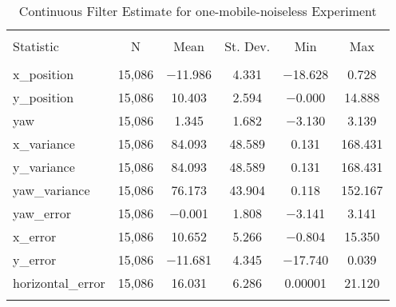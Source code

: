 
\begin{table}[h] \centering 
  \caption{Continuous Filter Estimate for one-mobile-noiseless Experiment} 
  \label{tab:one_mobile_noiseless_continuous_summary} 
\begin{tabular}{@{\extracolsep{5pt}}lccccc} 
\\[-1.8ex]\hline 
\hline \\[-1.8ex] 
Statistic & \multicolumn{1}{c}{N} & \multicolumn{1}{c}{Mean} & \multicolumn{1}{c}{St. Dev.} & \multicolumn{1}{c}{Min} & \multicolumn{1}{c}{Max} \\ 
\hline \\[-1.8ex] 
x\_position & 15,086 & $-$11.986 & 4.331 & $-$18.628 & 0.728 \\ 
y\_position & 15,086 & 10.403 & 2.594 & $-$0.000 & 14.888 \\ 
yaw & 15,086 & 1.345 & 1.682 & $-$3.130 & 3.139 \\ 
x\_variance & 15,086 & 84.093 & 48.589 & 0.131 & 168.431 \\ 
y\_variance & 15,086 & 84.093 & 48.589 & 0.131 & 168.431 \\ 
yaw\_variance & 15,086 & 76.173 & 43.904 & 0.118 & 152.167 \\ 
yaw\_error & 15,086 & $-$0.001 & 1.808 & $-$3.141 & 3.141 \\ 
x\_error & 15,086 & 10.652 & 5.266 & $-$0.804 & 15.350 \\ 
y\_error & 15,086 & $-$11.681 & 4.345 & $-$17.740 & 0.039 \\ 
horizontal\_error & 15,086 & 16.031 & 6.286 & 0.00001 & 21.120 \\ 
\hline \\[-1.8ex] 
\end{tabular} 
\end{table} 
